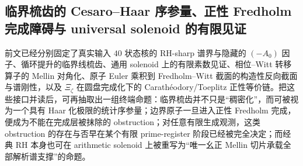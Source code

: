 \subsection{临界梳齿的 Cesaro--Haar 序参量、正性 Fredholm 完成障碍与 universal solenoid 的有限见证}\label{subsec:conclusion-rhsharp-comb-fredholm-solenoid-finite-witness}
前文已经分别固定了真实输入 \(40\) 状态核的 RH-sharp 谱界与隐藏的 \((-A_0)\) 因子、循环提升的临界线梳齿、通用 solenoid 上的有限素数见证、相位--Witt 转移算子的 Mellin 对角化、原子 Euler 乘积到 Fredholm--Witt 截面的构造性反向截面与谱刚性，以及 \(\Xi_\zeta\) 在圆盘完成化下的 Carath\'eodory/Toeplitz 正性等价链。把这些接口并读后，可再抽取出一组终端命题：临界梳齿并不只是“稠密化”，而可被视为一个具有 Haar 化极限的统计序参量；边界原子一旦进入正性 Fredholm 完成，便成为不能在完成层被抹除的 obstruction；对任意有限生成观测，这类 obstruction 的存在与否早在某个有限 prime-register 阶段已经被完全决定；而经典 RH 本身也可在 arithmetic solenoid 上被重写为“唯一幺正 Mellin 切片承载全部解析谱支撑”的命题。

